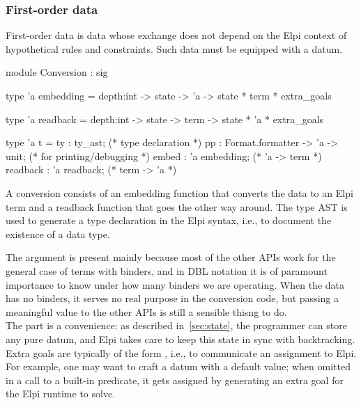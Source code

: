 \documentclass[a4paper, 11pt]{book}
\begin{document}



  

\subsubsection{First-order data}\label{sec:fodata}\label{sec:opaquedata}

First-order data is data whose exchange does not depend on the Elpi context of
hypothetical rules and constraints. Such data must be equipped with a
 datum.

\begin{ocamlcode}
module Conversion : sig

type 'a embedding =
  depth:int ->
  state -> 'a -> state * term * extra_goals

type 'a readback =
  depth:int ->
  state -> term -> state * 'a * extra_goals

type 'a t = {
  ty : ty_ast;                         (* type declaration *)
  pp : Format.formatter -> 'a -> unit; (* for printing/debugging *)
  embed : 'a embedding;                (* 'a -> term *)
  readback : 'a readback;              (* term -> 'a *)
}
\end{ocamlcode}

\noindent
A conversion consists of an embedding function that converts the data to an
Elpi term and a readback function that goes the other way around. The type AST
 is used to generate a type declaration in the Elpi syntax, i.e.,
to document the existence of a data type.


The  argument is present mainly because most of the other APIs
work for the general case of terms with binders, and in DBL notation it is of
paramount importance to know under how many binders we are operating. When the
data has no binders, it serves no real purpose in the conversion code, but
passing a meaningful value to the other APIs is still a sensible thisng to do.\\
The  part is a convenience: as described in~\cref{sec:state},
the programmer can store any pure datum, and Elpi takes care to keep this
state in sync with backtracking.\\
Extra goals are typically of the form , i.e., to communicate an
assignment to Elpi. For example, one may want to craft a datum with a default
value; when omitted in a call to a built-in predicate, it gets assigned by
generating an extra goal for the Elpi runtime to solve.
\end{document}
